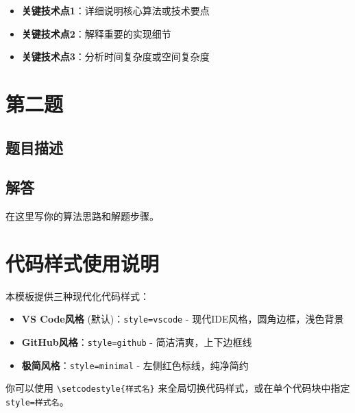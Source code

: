 \documentclass[12pt,a4paper]{article}
\numberwithin{equation}{section}
\newenvironment{solution}
{\begin{tcolorbox}[colback=pkured!5,colframe=pkured,title=算法思路,fonttitle=\bfseries\color{white}]}
{\end{tcolorbox}}
\begin{document}
\begin{keypoints}
\begin{itemize}[leftmargin=15pt]
    \item \textbf{关键技术点1}：详细说明核心算法或技术要点
    \item \textbf{关键技术点2}：解释重要的实现细节
    \item \textbf{关键技术点3}：分析时间复杂度或空间复杂度
\end{itemize}
\end{keypoints}

\section{第二题}

\subsection{题目描述}

\subsection{解答}

\begin{solution}
在这里写你的算法思路和解题步骤。
\end{solution}


\section{代码样式使用说明}

本模板提供三种现代化代码样式：

\begin{itemize}[leftmargin=20pt]
    \item \textbf{VS Code风格} (默认)：\texttt{style=vscode} - 现代IDE风格，圆角边框，浅色背景
    \item \textbf{GitHub风格}：\texttt{style=github} - 简洁清爽，上下边框线
    \item \textbf{极简风格}：\texttt{style=minimal} - 左侧红色标线，纯净简约
\end{itemize}

你可以使用 \texttt{\textbackslash setcodestyle\{样式名\}} 来全局切换代码样式，或在单个代码块中指定 \texttt{style=样式名}。
\end{document}
